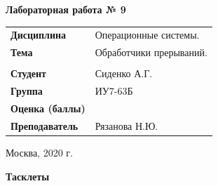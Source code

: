 \documentclass[a4paper,14pt]{extreport} %
\begin{document}
\begin{titlepage}
    \vspace{2cm}

    \begin{center}
        \textbf{Лабораторная работа № 9} \\
        \vspace{0.5cm}
    \end{center}

    \vspace{4cm}

    \begin{flushleft}
        \begin{tabular}{ll}
            \textbf{Дисциплина} & Операционные системы.  \\
            \textbf{Тема} & Обработчики прерываний.  \\
            \\
            \textbf{Студент} & Сиденко А.Г. \\
            \textbf{Группа} & ИУ7-63Б \\
            \textbf{Оценка (баллы)} & \\
            \textbf{Преподаватель} & Рязанова Н.Ю.   \\
        \end{tabular}
    \end{flushleft}

    \vspace{4cm}

   \begin{center}
        Москва, 2020 г.
    \end{center}

\end{titlepage}

\hfill

\textbf{Тасклеты}
\end{document}
